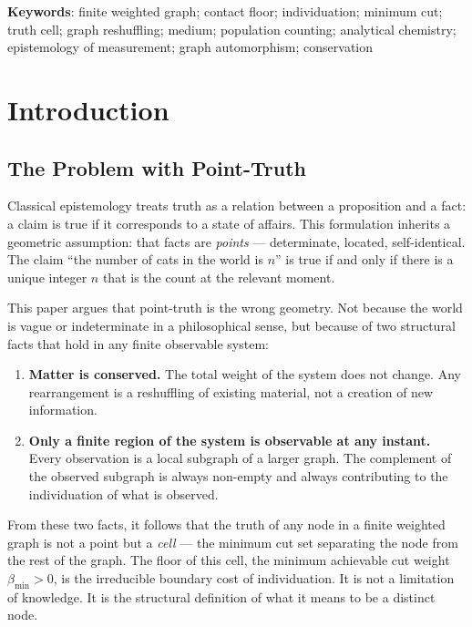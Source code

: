 \documentclass[12pt, a4paper]{article}
\theoremstyle{plain}
\theoremstyle{definition}
\theoremstyle{remark}
\newcommand{\bmin}{\beta_{\min}}
\begin{document}
\vspace{1em}
\noindent\textbf{Keywords}: finite weighted graph; contact floor; individuation;
minimum cut; truth cell; graph reshuffling; medium; population counting;
analytical chemistry; epistemology of measurement; graph automorphism;
conservation

\tableofcontents
\newpage

\section{Introduction}
\label{sec:introduction}

\subsection{The Problem with Point-Truth}

Classical epistemology treats truth as a relation between a proposition and
a fact: a claim is true if it corresponds to a state of affairs. This
formulation inherits a geometric assumption: that facts are \emph{points} ---
determinate, located, self-identical. The claim ``the number of cats in the
world is $n$'' is true if and only if there is a unique integer $n$ that is
the count at the relevant moment.

This paper argues that point-truth is the wrong geometry. Not because the world
is vague or indeterminate in a philosophical sense, but because of two structural
facts that hold in any finite observable system:

\begin{enumerate}[label=(\roman*)]
  \item \textbf{Matter is conserved.} The total weight of the system does not
  change. Any rearrangement is a reshuffling of existing material, not a
  creation of new information.

  \item \textbf{Only a finite region of the system is observable at any
  instant.} Every observation is a local subgraph of a larger graph. The
  complement of the observed subgraph is always non-empty and always
  contributing to the individuation of what is observed.
\end{enumerate}

From these two facts, it follows that the truth of any node in a finite
weighted graph is not a point but a \emph{cell} --- the minimum cut set
separating the node from the rest of the graph. The floor of this cell,
the minimum achievable cut weight $\bmin > 0$, is the irreducible boundary
cost of individuation. It is not a limitation of knowledge. It is the
structural definition of what it means to be a distinct node.
\end{document}
